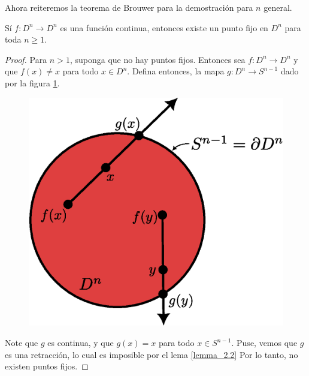 Ahora reiteremos la teorema de Brouwer para la demostraci\'on para $n$ general.

\begin{theorem}
    S\'i $f:D^n \rightarrow D^n$ es una funci\'on continua, entonces existe un
    punto fijo en $D^n$ para toda $n \geq 1$.
\end{theorem}
\begin{proof}
    Para $n>1$, suponga que no hay puntos fijos. Entonces sea $f:D^n \rightarrow
    D^n$ y que $f(x) \neq x$ para todo $x \in D^n$. Defina entonces, la mapa
    $g:D^n \rightarrow S^{n-1}$ dado por la figura \ref{fig_4}.
    \begin{figure}[h]
        \centering
        \includegraphics[scale=0.5]{Figures/brouwer_thm_2.eps}
        \caption{}
        \label{fig_4}
    \end{figure}
    Note que $g$ es continua, y que  $g(x)=x$ para todo $x \in S^{n-1}$. Puse,
    vemos que $g$ es una retracci\'on, lo cual es imposible por el lema
    \ref{lemma_2.2} Por lo tanto, no existen puntos fijos.
\end{proof}
